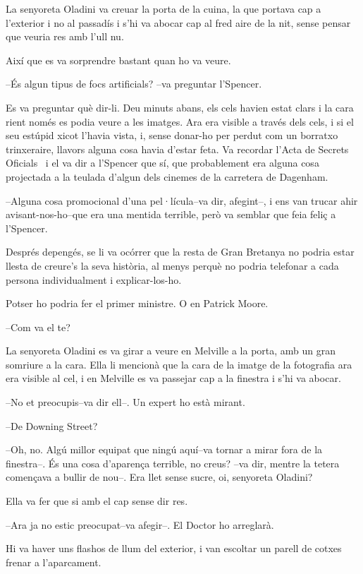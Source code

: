 La senyoreta Oladini va creuar la porta de la cuina, la que portava cap
a l'exterior i no al passadís i s'hi va abocar cap al fred aire de la
nit, sense pensar que veuria res amb l'ull nu.

Així que es va sorprendre bastant quan ho va veure.

--És algun tipus de focs artificials? --va preguntar l'Spencer.

Es va preguntar què dir-li. Deu minuts abans, els cels havien estat
clars i la cara rient només es podia veure a les imatges. Ara era
visible a través dels cels, i si el seu estúpid xicot l'havia vista, i,
sense donar-ho per perdut com un borratxo trinxeraire, llavors alguna
cosa havia d'estar feta. Va recordar l'Acta de Secrets Oficials ~i el va
dir a l'Spencer que sí, que probablement era alguna cosa projectada a la
teulada d'algun dels cinemes de la carretera de Dagenham.

--Alguna cosa promocional d'una pel·lícula--va dir, afegint--, i ens van
trucar ahir avisant-nos-ho--que era una mentida terrible, però va
semblar que feia feliç a l'Spencer.

Després depengés, se li va ocórrer que la resta de Gran Bretanya no
podria estar llesta de creure's la seva història, al menys perquè no
podria telefonar a cada persona individualment i explicar-los-ho.

Potser ho podria fer el primer ministre. O en Patrick Moore.

--Com va el te?

La senyoreta Oladini es va girar a veure en Melville a la porta, amb un
gran somriure a la cara. Ella li mencionà que la cara de la imatge de la
fotografia ara era visible al cel, i en Melville es va passejar cap a la
finestra i s'hi va abocar.

--No et preocupis--va dir ell--. Un expert ho està mirant.

--De Downing Street?

--Oh, no. Algú millor equipat que ningú aquí--va tornar a mirar fora de
la finestra--. És una cosa d'aparença terrible, no creus? --va dir,
mentre la tetera començava a bullir de nou--. Era llet sense sucre, oi,
senyoreta Oladini?

Ella va fer que si amb el cap sense dir res.

--Ara ja no estic preocupat--va afegir--. El Doctor ho arreglarà.

Hi va haver uns flashos de llum del exterior, i van escoltar un parell
de cotxes frenar a l'aparcament.

